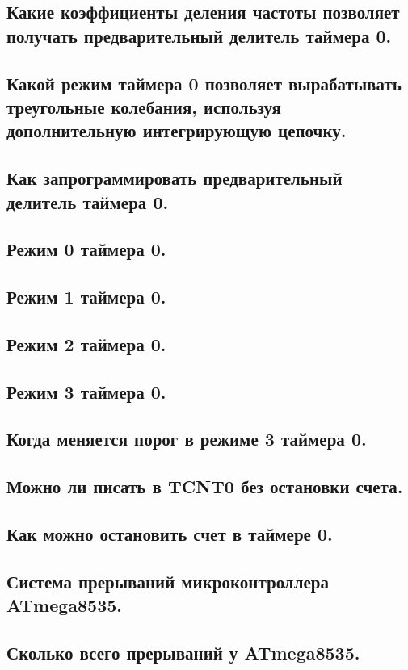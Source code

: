 \subsection{Какие коэффициенты деления частоты позволяет получать предварительный делитель таймера 0.}
\subsection{Какой режим таймера 0 позволяет вырабатывать треугольные колебания, используя дополнительную интегрирующую цепочку.}
\subsection{Как запрограммировать предварительный делитель таймера 0.}
\subsection{Режим 0 таймера 0.}
\subsection{Режим 1 таймера 0.}
\subsection{Режим 2 таймера 0.}
\subsection{Режим 3 таймера 0.}
\subsection{Когда меняется порог в режиме 3 таймера 0.}
\subsection{Можно ли писать в TCNT0 без остановки счета.}
\subsection{Как можно остановить счет в таймере 0.}
\subsection{Система прерываний микроконтроллера ATmega8535.}
\subsection{Сколько всего прерываний у ATmega8535.}
